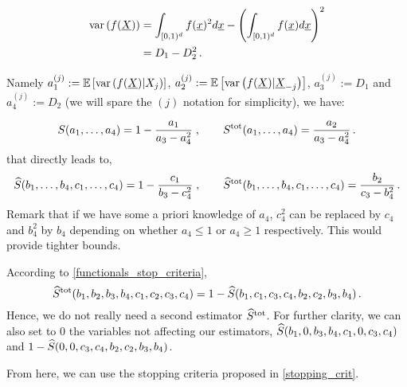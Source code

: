 \documentclass[]{amsart}
\begin{document}
\begin{align*}
\operatorname{var} \left(f(\underline{X})\right) & = \int_{[0,1)^d}f(\underline{x})^2 d \underline{x} - \left(\int_{[0,1)^d}f(\underline{x}) d \underline{x}\right)^2 \\
& = D_1 - D_2^2 \, .
\end{align*}

Namely $a_1^{(j)} :=\mathbb{E}\left[ \operatorname{var} \left(f(\underline{X})|X_j\right)\right]$, $a_2^{(j)} := \mathbb{E}\left[ \operatorname{var} \left(f(\underline{X})|\underline{X}_{-j}\right)\right]$, $a_3^{(j)} := D_1$ and $a_4^{(j)} := D_2$ (we will spare the ${(j)}$ notation for simplicity), we have:

\begin{equation}
S(a_1,\dots,a_4)=1-\frac{a_1}{a_3-a_4^2} \; , \qquad S^\textup{tot}(a_1,\dots,a_4)=\frac{a_2}{a_3-a_4^2} \, .
\end{equation}
that directly leads to,
\begin{equation}\label{functionals_stop_criteria}
\widehat{S}(b_1,\dots,b_4,c_1,\dots,c_4)=1-\frac{c_1}{b_3-c_4^2} \; , \qquad \widehat{S}^\textup{tot}(b_1,\dots,b_4,c_1,\dots,c_4)=\frac{b_2}{c_3-b_4^2} \, .
\end{equation}
Remark that if we have some a priori knowledge of $a_4$, $c_4^2$ can be replaced by $c_4$ and $b_4^2$ by $b_4$ depending on whether $a_4 \leq 1$ or $a_4 \geq 1$ respectively. This would provide tighter bounds.

According to \eqref{functionals_stop_criteria},
\begin{equation}
\widehat{S}^\textup{tot}(b_1,b_2,b_3,b_4,c_1,c_2,c_3,c_4) = 1 - \widehat{S}(b_1,c_1,c_3,c_4,b_2,c_2,b_3,b_4) \, .
\end{equation}
Hence, we do not really need a second estimator $\widehat{S}^\textup{tot}$. For further clarity, we can also set to $0$ the variables not affecting our estimators, $\widehat{S}(b_1,0,b_3,b_4,c_1,0,c_3,c_4)$ and $1-\widehat{S}(0,0,c_3,c_4,b_2,c_2,b_3,b_4)$.

From here, we can use the stopping criteria proposed in \eqref{stopping_crit}.
\end{document}
